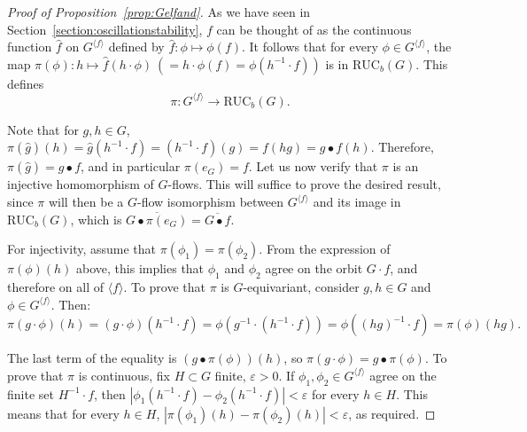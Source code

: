 \documentclass[10pt,a4paper]{article}
\theoremstyle{definition}
\numberwithin{equation}{section}
\numberwithin{figure}{section}
\numberwithin{table}{section}
\newcommand{\e}{\varepsilon}
\newcommand{\RUCB}{\mathrm{RUC}_{b}}
\begin{document}
\begin{proof}[Proof of Proposition~\ref{prop:Gelfand}]
As we have seen in Section~\ref{section:oscillationstability}, $f$ can be thought of as the continuous function $\hat f$ on $G^{\langle f \rangle}$ defined by $\hat f:\phi\mapsto \phi(f)$. It follows that for every $\phi\in G^{\langle f \rangle}$, the map $\pi(\phi):h\mapsto \hat f (h\cdot \phi) \ (=h\cdot \phi(f) = \phi(h^{-1}\cdot f))$ is in $\RUCB(G)$. This defines
\[
\pi:G^{\langle f \rangle}\longrightarrow \RUCB(G).
\]

Note that for $g,h\in G$, $\pi(\hat g)(h)=\hat g(h^{-1}\cdot f)=(h^{-1}\cdot f)(g)=f(hg)=g\bullet f(h)$. Therefore, $\pi(\hat g)=g\bullet f$, and in particular $\pi(e_{G})=f$. Let us now verify that $\pi$ is an injective homomorphism of $G$-flows. This will suffice to prove the desired result, since $\pi$ will then be a $G$-flow isomorphism between $G^{\langle f \rangle}$ and its image in $ \RUCB(G)$, which is $\overline{G\bullet \pi(e_{G})}=\overline{G\bullet f}$.

For injectivity, assume that $\pi(\phi_{1})=\pi(\phi_{2})$. From the expression of $\pi(\phi)(h)$ above, this implies that $\phi_{1}$ and $\phi_{2}$ agree on the orbit $G\cdot f$, and therefore on all of $\langle f \rangle$. To prove that $\pi$ is $G$-equivariant, consider $g,h\in G$ and $\phi\in G^{\langle f \rangle}$. Then:
\[
\pi(g\cdot \phi)(h)=(g\cdot \phi)(h^{-1}\cdot f)=\phi(g^{-1}\cdot(h^{-1}\cdot f))=\phi((hg)^{-1}\cdot f)=\pi(\phi)(hg).
\]

The last term of the equality is $(g\bullet\pi(\phi))(h)$, so $\pi(g\cdot \phi)=g\bullet\pi(\phi)$. To prove that $\pi$ is continuous, fix $H\subset G$ finite, $\e>0$. If $\phi_{1}, \phi_{2}\in G^{\langle f \rangle}$ agree on the finite set $H^{-1}\cdot f$, then $|\phi_{1}(h^{-1}\cdot f)-\phi_{2}(h^{-1}\cdot f)|<\e$ for every $h\in H$. This means that for every $h\in H$, $|\pi(\phi_{1})(h)-\pi(\phi_{2})(h)|<\e$, as required.
\end{proof}
\end{document}
